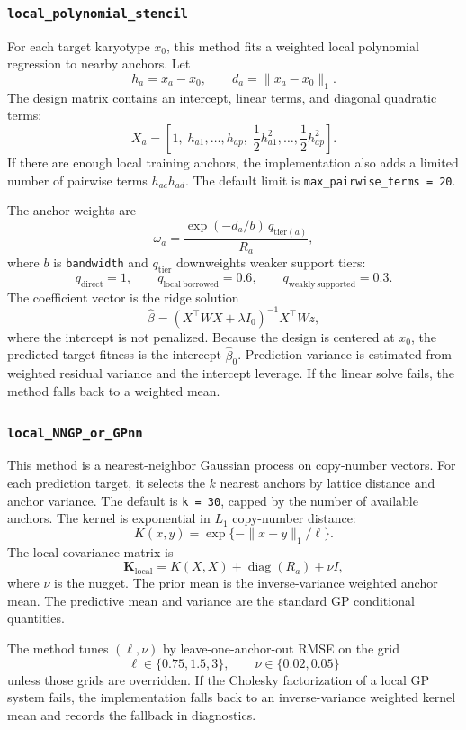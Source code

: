 \documentclass[11pt]{article}
\begin{document}
\subsubsection{\texttt{local\_polynomial\_stencil}}

For each target karyotype $x_0$, this method fits a weighted local polynomial
regression to nearby anchors. Let
\[
  h_a=x_a-x_0,\qquad
  d_a=\|x_a-x_0\|_1.
\]
The design matrix contains an intercept, linear terms, and diagonal quadratic
terms:
\[
  X_a =
  \left[
    1,\;
    h_{a1},\ldots,h_{ap},\;
    \frac{1}{2}h_{a1}^2,\ldots,\frac{1}{2}h_{ap}^2
  \right].
\]
If there are enough local training anchors, the implementation also adds a
limited number of pairwise terms $h_{ac}h_{ad}$. The default limit is
\texttt{max\_pairwise\_terms = 20}.

The anchor weights are
\[
  \omega_a
  =
  \frac{
    \exp(-d_a/b)\,q_{\mathrm{tier}(a)}
  }{
    R_a
  },
\]
where $b$ is \texttt{bandwidth} and $q_{\mathrm{tier}}$ downweights weaker
support tiers:
\[
q_{\mathrm{direct}}=1,\qquad
q_{\mathrm{local\ borrowed}}=0.6,\qquad
q_{\mathrm{weakly\ supported}}=0.3.
\]
The coefficient vector is the ridge solution
\[
  \hat\beta
  =
  (X^\top W X+\lambda I_0)^{-1}X^\top Wz,
\]
where the intercept is not penalized. Because the design is centered at
$x_0$, the predicted target fitness is the intercept $\hat\beta_0$. Prediction
variance is estimated from weighted residual variance and the intercept
leverage. If the linear solve fails, the method falls back to a weighted mean.

\subsubsection{\texttt{local\_NNGP\_or\_GPnn}}

This method is a nearest-neighbor Gaussian process on copy-number vectors. For
each prediction target, it selects the $k$ nearest anchors by lattice distance
and anchor variance. The default is \texttt{k = 30}, capped by the number of
available anchors. The kernel is exponential in $L_1$ copy-number distance:
\[
  K(x,y)=\exp\{-\|x-y\|_1/\ell\}.
\]
The local covariance matrix is
\[
  \bm K_{\mathrm{local}}
  =
  K(X,X)+\operatorname{diag}(R_a)+\nu I,
\]
where $\nu$ is the nugget. The prior mean is the inverse-variance weighted
anchor mean. The predictive mean and variance are the standard GP conditional
quantities.

The method tunes $(\ell,\nu)$ by leave-one-anchor-out RMSE on the grid
\[
  \ell\in\{0.75,1.5,3\},\qquad
  \nu\in\{0.02,0.05\}
\]
unless those grids are overridden. If the Cholesky factorization of a local GP
system fails, the implementation falls back to an inverse-variance weighted
kernel mean and records the fallback in diagnostics.
\end{document}
